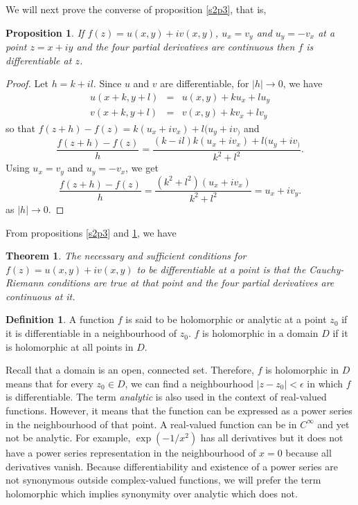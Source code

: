 \documentclass{article}
\theoremstyle{plain}
\newtheorem{thm}{Theorem}
\numberwithin{thm}{section}
\theoremstyle{plain}
\newtheorem{prop}{Proposition}
\numberwithin{prop}{section}
\theoremstyle{plain}
\numberwithin{prop}{section}
\theoremstyle{definition}
\newtheorem{defn}{Definition}
\numberwithin{defn}{section}
\theoremstyle{remark}
\numberwithin{equation}{section}
\begin{document}
We will next prove the converse of proposition \ref{s2p3}, that is,
\begin{prop}\label{s2p5}
If $f(z) = u(x, y) + iv(x, y)$, $u_x = v_y$ and $u_y = -v_x$ at a point
$z = x + iy$ and the four partial derivatives are continuous then $f$ is 
differentiable at $z$.
\end{prop}
\begin{proof}
Let $h = k + il$. Since $u$ and $v$ are differentiable, for $|h| \rightarrow 0$,
we have
\begin{eqnarray*}
u(x + k, y + l) &=& u(x, y) + ku_x + lu_y \\
v(x + k, y + l) &=& v(x, y) + kv_x + lv_y
\end{eqnarray*}
so that $f(z + h) - f(z) = k(u_x + iv_x) + l(u_y + iv_)$ and
\[
\frac{f(z + h)-f(z)}{h} = \frac{(k - il)k(u_x + iv_x) + l(u_y + iv_)}{k^2+l^2}.
\]
Using $u_x = v_y$ and $u_y = -v_x$, we get
\[
\frac{f(z + h) - f(z)}{h} = \frac{(k^2 + l^2)(u_x + iv_x)}{k^2+l^2} =
u_x + iv_y.
\]
as $|h| \rightarrow 0$.
\end{proof}

From propositions \ref{s2p3} and \ref{s2p5}, we have
\begin{thm}\label{s2t1}
The necessary and sufficient conditions for $f(z) = u(x, y) + iv(x, y)$ to be
differentiable at a point is that the Cauchy-Riemann conditions are true at
that point and the four partial derivatives are continuous at it.
\end{thm}

\begin{defn}
A function $f$ is said to be holomorphic or analytic at a point $z_0$ if it is 
differentiable in a neighbourhood of $z_0$. $f$ is holomorphic in a domain $D$
if it is holomorphic at all points in $D$.
\end{defn}
Recall that a domain is an open, connected set. Therefore, $f$ is holomorphic
in $D$ means that for every $z_0 \in D$, we can find a neighbourhood $|z - z_0|
< \epsilon$ in which $f$ is differentiable. The term \emph{analytic} is also
used in the context of real-valued functions. However, it means that the 
function can be expressed as a power series in the neighbourhood of that point.
A real-valued function can be in $C^\infty$ and yet not be analytic. For example,
$\exp(-1/x^2)$ has all derivatives but it does not have a power series 
representation in the neighbourhood of $x = 0$ because all derivatives vanish.
Because differentiability and existence of a power series are not synonymous
outside complex-valued functions, we will prefer the term holomorphic which 
implies synonymity over analytic which does not.
\end{document}
